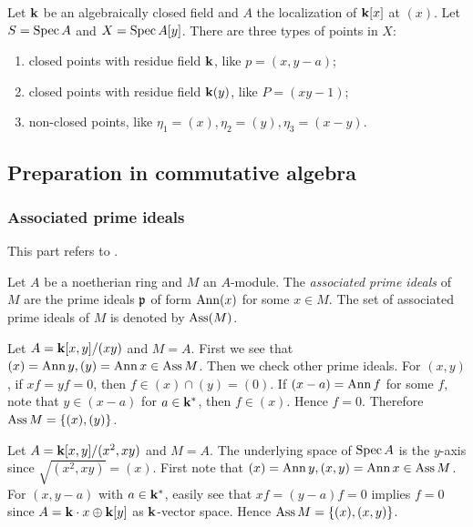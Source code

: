     \begin{example}
        Let ${\mathbf{k}}$ be an algebraically closed field and $A$ the localization of ${\mathbf{k}}[x]$ at $(x)$.
        Let $S = \operatorname{Spec} A$ and $X = \operatorname{Spec} A[y]$. 
        There are three types of points in $X$:
        \begin{enumerate}[label=(\roman*)]
            \item closed points with residue field ${\mathbf{k}}$, like $p = (x,y-a)$;
            \item closed points with residue field ${\mathbf{k}}(y)$, like $P = (xy-1)$;
            \item non-closed points, like $\eta_1 = (x),\eta_2 = (y),\eta_3 = (x-y)$.
        \end{enumerate}

    \end{example}

\subsection{Preparation in commutative algebra}

    \subsubsection{Associated prime ideals}

        This part refers to \cite[Chapter 3]{Mat70}.

        \begin{definition}\label{def: associated prime ideals}
            Let $A$ be a noetherian ring and $M$ an $A$-module.
            The \textit{associated prime ideals} of $M$ are the prime ideals ${\mathfrak{p}}$ of form $\operatorname{Ann}(x)$ for some $x \in M$.
            The set of associated prime ideals of $M$ is denoted by $\operatorname{Ass}(M)$.
        \end{definition}

        \begin{example}
            Let $A = {\mathbf{k}}[x,y]/(xy)$ and $M = A$.
            First we see that $(x) = \operatorname{Ann} y, (y) = \operatorname{Ann} x \in \operatorname{Ass} M$.
            Then we check other prime ideals.
            For $(x,y)$, if $xf = yf = 0$, then $f \in (x) \cap (y) = (0)$.
            If $(x-a) = \operatorname{Ann} f$ for some $f$, note that $y \in (x-a)$ for $a \in {\mathbf{k}}^*$, then $f \in (x)$.
            Hence $f = 0$. 
            Therefore $\operatorname{Ass} M = \{ (x), (y) \}$.
        \end{example}

        \begin{example}
            Let $A = {\mathbf{k}}[x,y]/(x^2, xy)$ and $M = A$.
            The underlying space of $\operatorname{Spec} A$ is the $y$-axis since $\sqrt{(x^2,xy)} = (x)$.
            First note that $(x) = \operatorname{Ann} y, (x,y) = \operatorname{Ann} x \in \operatorname{Ass} M$.
            For $(x,y-a)$ with $a \in {\mathbf{k}}^*$, easily see that $xf = (y-a)f = 0$ implies $f=0$ since $A = {\mathbf{k}} \cdot x \oplus {\mathbf{k}}[y]$ as ${\mathbf{k}}$-vector space.
            Hence $\operatorname{Ass} M = \{ (x), (x,y) \}$.
        \end{example}

